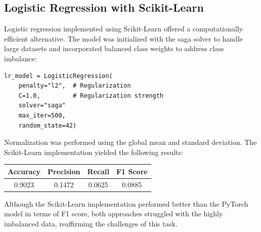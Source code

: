 \documentclass[conference,9pt]{IEEEtran}
\begin{document}
\subsection{Logistic Regression with Scikit-Learn}
Logistic regression implemented using Scikit-Learn offered a computationally efficient alternative. The model was initialized with the saga solver to handle large datasets and incorporated balanced class weights to address class imbalance:

\begin{lstlisting}
lr_model = LogisticRegression(
    penalty="l2",  # Regularization
    C=1.0,         # Regularization strength
    solver="saga"
    max_iter=500,
    random_state=42)
\end{lstlisting}
Normalization was performed using the global mean and standard deviation. The Scikit-Learn implementation yielded the following results:
\begin{center}
    \begin{tabular}{c|c|c|c}
        Accuracy & Precision & Recall & F1 Score \\ 
        \hline 
        0.9023 & 0.1472 &  0.0625 & 0.0885\\
    \end{tabular}
\end{center}
Although the Scikit-Learn implementation performed better than the PyTorch model in terms of F1 score, both approaches struggled with the highly imbalanced data, reaffirming the challenges of this task.
\end{document}
